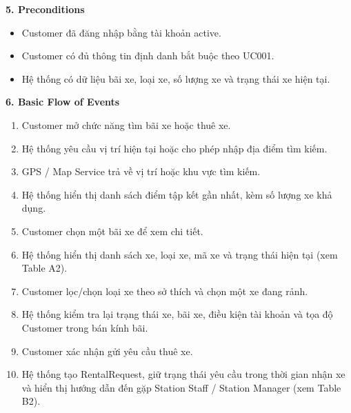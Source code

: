 \textbf{5. Preconditions}
\begin{itemize}
  \item Customer đã đăng nhập bằng tài khoản active.
  \item Customer có đủ thông tin định danh bắt buộc theo UC001.
  \item Hệ thống có dữ liệu bãi xe, loại xe, số lượng xe và trạng thái xe hiện tại.
\end{itemize}

\textbf{6. Basic Flow of Events}
\begin{enumerate}
  \item Customer mở chức năng tìm bãi xe hoặc thuê xe.
  \item Hệ thống yêu cầu vị trí hiện tại hoặc cho phép nhập địa điểm tìm kiếm.
  \item GPS / Map Service trả về vị trí hoặc khu vực tìm kiếm.
  \item Hệ thống hiển thị danh sách điểm tập kết gần nhất, kèm số lượng xe khả dụng.
  \item Customer chọn một bãi xe để xem chi tiết.
  \item Hệ thống hiển thị danh sách xe, loại xe, mã xe và trạng thái hiện tại (xem Table A2).
  \item Customer lọc/chọn loại xe theo sở thích và chọn một xe đang rảnh.
  \item Hệ thống kiểm tra lại trạng thái xe, bãi xe, điều kiện tài khoản và tọa độ Customer trong bán kính bãi.
  \item Customer xác nhận gửi yêu cầu thuê xe.
  \item Hệ thống tạo RentalRequest, giữ trạng thái yêu cầu trong thời gian nhận xe và hiển thị hướng dẫn đến gặp Station Staff / Station Manager (xem Table B2).
\end{enumerate}

